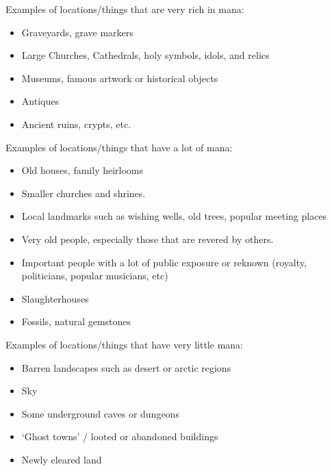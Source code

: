 \documentclass[twoside]{book}
\begin{document}
    {  
      Examples of locations/things that are very rich in
             mana: 
    }
  
\begin{itemize}
      
  \item   Graveyards, grave markers 
  \item   Large Churches, Cathedrals, holy symbols, idols,
               and relics 
  \item   Museums, famous artwork or historical objects
               
  \item   Antiques 
  \item   Ancient ruins, crypts, etc. 
\end{itemize}
  
    {  
      Examples of locations/things that have a lot of mana:
             
    }
  
\begin{itemize}
      
  \item   Old houses, family heirlooms 
  \item   Smaller churches and shrines. 
  \item   Local landmarks such as wishing wells, old trees,
               popular meeting places 
  \item   Very old people, especially those that are revered
               by others. 
  \item   Important people with a lot of public exposure or
               reknown (royalty, politicians, popular musicians, etc)
               
  \item   Slaughterhouses 
  \item   Fossils, natural gemstones 
\end{itemize}
  
    {  
      Examples of locations/things that have very little
             mana: 
    }
  
\begin{itemize}
      
  \item   Barren landscapes such as desert or arctic regions
               
  \item   Sky 
  \item   Some underground caves or dungeons 
  \item   `Ghost towns' / looted or abandoned
               buildings 
  \item   Newly cleared land 
\end{itemize}
  
\end{document}
